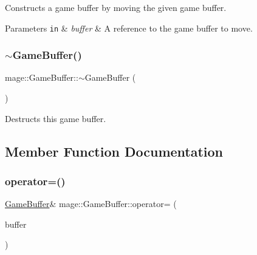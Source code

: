 Constructs a game buffer by moving the given game buffer.


\begin{DoxyParams}[1]{Parameters}
\mbox{\tt in}  & {\em buffer} & A reference to the game buffer to move. \\
\hline
\end{DoxyParams}
\hypertarget{structmage_1_1_game_buffer_ac1ae097a91a446184b71bb4dd9acf8b4}{}\label{structmage_1_1_game_buffer_ac1ae097a91a446184b71bb4dd9acf8b4} 
\subsubsection{\texorpdfstring{$\sim$\+Game\+Buffer()}{~GameBuffer()}}
{\footnotesize\ttfamily mage\+::\+Game\+Buffer\+::$\sim$\+Game\+Buffer (\begin{DoxyParamCaption}{ }\end{DoxyParamCaption})\hspace{0.3cm}{\ttfamily [default]}}

Destructs this game buffer. 

\subsection{Member Function Documentation}
\hypertarget{structmage_1_1_game_buffer_aa21f68c930b1c180aaaeeee95854b021}{}\label{structmage_1_1_game_buffer_aa21f68c930b1c180aaaeeee95854b021} 
\subsubsection{\texorpdfstring{operator=()}{operator=()}\hspace{0.1cm}{\footnotesize\ttfamily [1/2]}}
{\footnotesize\ttfamily \hyperlink{structmage_1_1_game_buffer}{Game\+Buffer}\& mage\+::\+Game\+Buffer\+::operator= (\begin{DoxyParamCaption}\item[{const \hyperlink{structmage_1_1_game_buffer}{Game\+Buffer} \&}]{buffer }\end{DoxyParamCaption})\hspace{0.3cm}{\ttfamily [default]}}


